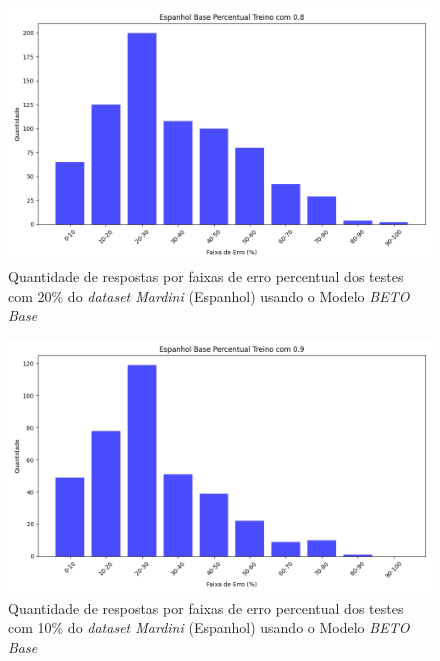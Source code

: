 \begin{figure}[h!]
\includegraphics[width=\textwidth]{img/grafsEsp/Espanhol Base Percentual Treino com 0.8_quantidade.png}
\caption{Quantidade de respostas por faixas de erro percentual dos testes com 20\% do \textit{dataset Mardini} (Espanhol) usando o Modelo \textit{BETO Base}}\label{figure:6}
\end{figure}

\begin{figure}[h!]
\includegraphics[width=\textwidth]{img/grafsEsp/Espanhol Base Percentual Treino com 0.9_quantidade.png}
\caption{Quantidade de respostas por faixas de erro percentual dos testes com 10\% do \textit{dataset Mardini} (Espanhol) usando o Modelo \textit{BETO Base}}\label{figure:7}
\end{figure}